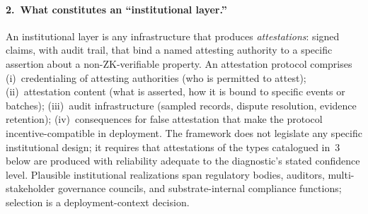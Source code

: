 \begin{remark}
\paragraph{2.~What constitutes an ``institutional layer.''}
An institutional layer is any infrastructure that produces
\emph{attestations}: signed claims, with audit trail, that
bind a named attesting authority to a specific assertion about
a non-ZK-verifiable property.  An attestation protocol
comprises (i)~credentialing of attesting authorities (who is
permitted to attest); (ii)~attestation
content (what is asserted, how it is bound to specific events
or batches); (iii)~audit infrastructure (sampled records,
dispute resolution, evidence retention); (iv)~consequences for
false attestation that make the protocol incentive-compatible
in deployment.  The framework does not legislate any specific
institutional design; it requires that attestations of the
types catalogued in~3 below are produced with reliability
adequate to the diagnostic's stated confidence level.
Plausible institutional realizations span regulatory bodies,
auditors, multi-stakeholder governance councils, and
substrate-internal compliance functions; selection is a
deployment-context decision.


\end{remark}
